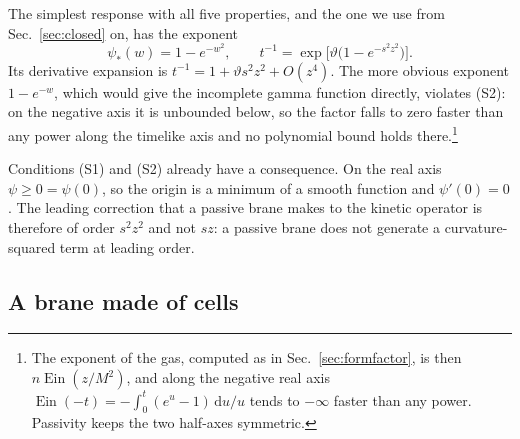 \documentclass[aps,prd,10pt,twocolumn,superscriptaddress,nofootinbib,floatfix,longbibliography]{revtex4-2}
\newcommand{\dd}{\mathrm{d}}
\newcommand{\Ein}{\operatorname{Ein}}
\begin{document}
The simplest response with all five properties, and the one we use from Sec.~\ref{sec:closed} on, has the exponent
\begin{equation}
\label{eq:phistar}
\psi_*(w)=1-e^{-w^2},\qquad t^{-1}=\exp\bigl[\vartheta\bigl(1-e^{-s^2z^2}\bigr)\bigr].
\end{equation}
Its derivative expansion is $t^{-1}=1+\vartheta s^2z^2+O(z^4)$. The more obvious exponent $1-e^{-w}$, which would give the incomplete gamma function directly, violates (S2): on the negative axis it is unbounded below, so the factor falls to zero faster than any power along the timelike axis and no polynomial bound holds there.\footnote{The exponent of the gas, computed as in Sec.~\ref{sec:formfactor}, is then $n\Ein(z/M^2)$, and along the negative real axis $\Ein(-t)=-\int_0^t(e^{u}-1)\,\dd u/u$ tends to $-\infty$ faster than any power. Passivity keeps the two half-axes symmetric.}

Conditions (S1) and (S2) already have a consequence. On the real axis $\psi\ge0=\psi(0)$, so the origin is a minimum of a smooth function and $\psi'(0)=0$. The leading correction that a passive brane makes to the kinetic operator is therefore of order $s^2z^2$ and not $sz$: a passive brane does not generate a curvature-squared term at leading order.

\subsection{A brane made of cells}
\label{sec:cells}
\end{document}
